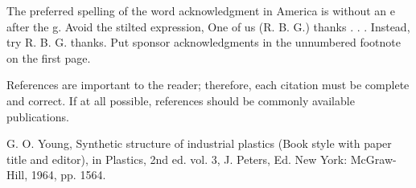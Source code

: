 \documentclass[letterpaper, 10 pt, conference]{ieeeconf}  %
\begin{document}
The preferred spelling of the word acknowledgment in America is without an e after the g. Avoid the stilted expression, One of us (R. B. G.) thanks . . .  Instead, try R. B. G. thanks. Put sponsor acknowledgments in the unnumbered footnote on the first page.




References are important to the reader; therefore, each citation must be complete and correct. If at all possible, references should be commonly available publications.



\begin{thebibliography}{99}

 G. O. Young, Synthetic structure of industrial plastics (Book style with paper title and editor), 	in Plastics, 2nd ed. vol. 3, J. Peters, Ed.  New York: McGraw-Hill, 1964, pp. 1564.







\end{thebibliography}
\end{document}
